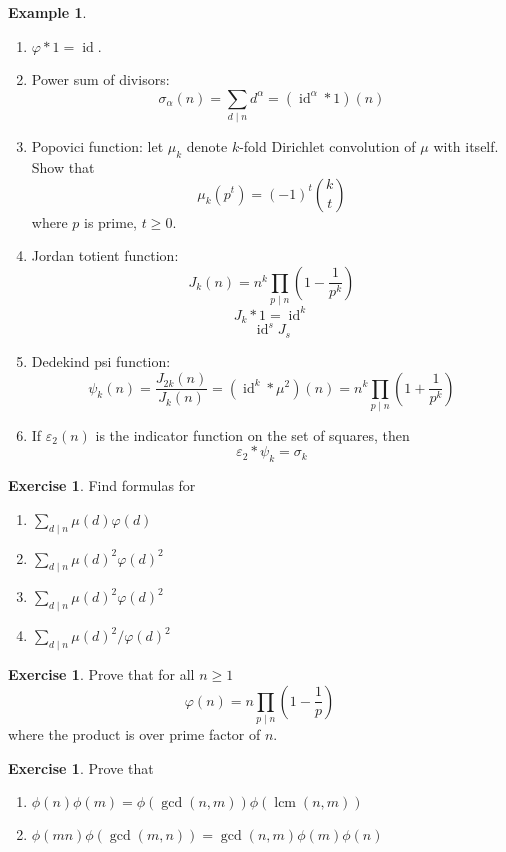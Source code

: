 \documentclass{article}
\theoremstyle{definition}
\newtheorem{example}[theorem]{Example}
\newtheorem{exercise}[theorem]{Exercise}
\begin{document}
\begin{shaded}
\begin{example} \ 
\begin{enumerate}
	\item $\varphi * 1 = \operatorname{id}$.
	\item Power sum of divisors:
	$$\sigma_\alpha (n) = \sum_{d \mid n} d^\alpha = (\operatorname{id}^\alpha * 1) (n)$$
	\item Popovici function: let $\mu_k$ denote $k$-fold Dirichlet convolution of $\mu$ with itself. Show that
	$$\mu_k (p^t) = (-1)^t {k \choose t}$$
	where $p$ is prime, $t \geq 0$.
	\item Jordan totient function:
	$$J_k (n) = n^k \prod_{p \mid n} \left( 1 - \frac{1}{p^k} \right)$$
	$$J_k * 1 = \operatorname{id}^k$$
	$$\operatorname{id}^s J_s$$
	\item Dedekind psi function:
	$$\psi_k (n) = \frac{J_{2k}(n)}{J_k (n)} = (\operatorname{id}^k * \mu^2) (n) = n^k \prod_{p \mid n} \left( 1 + \frac{1}{p^k} \right)$$
	\item If $\varepsilon_2 (n)$ is the indicator function on the set of squares, then
	$$\varepsilon_2 * \psi_k = \sigma_k$$
\end{enumerate}
\end{example}

\begin{exercise}
Find formulas for
\begin{enumerate}
	\item $\sum_{d \mid n} \mu(d)\varphi(d)$
	\item $\sum_{d \mid n} \mu(d)^2 \varphi(d)^2$
	\item $\sum_{d \mid n} \mu(d)^2 \varphi(d)^2$
	\item $\sum_{d \mid n} \mu(d)^2 / \varphi(d)^2$
\end{enumerate}
\end{exercise}
\begin{exercise}
Prove that for all $n \geq 1$
$$\varphi(n) = n \prod_{p \mid n} \left( 1 - \frac{1}{p} \right)$$
where the product is over prime factor of $n$.
\end{exercise}
\begin{exercise}
Prove that
\begin{enumerate}
	\item $\phi(n)\phi(m) = \phi(\gcd(n, m)) \phi(\operatorname{lcm}(n, m))$
	\item $\phi(mn)\phi(\gcd(m,n)) = \gcd(n, m) \phi(m)\phi(n)$
\end{enumerate}
\end{exercise}


\end{shaded}
\end{document}
